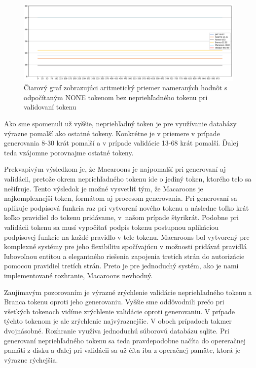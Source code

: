 \begin{figure}
  \centerline{\includegraphics[width=1\textwidth]{images/request_line_avg_without_opaque}}
  \caption[Čiarový graf -- validácia, konštantný]{Čiarový graf zobrazujúci aritmetický priemer nameraných hodnôt s odpočítaným NONE tokenom bez nepriehľadného tokenu pri validovaní tokenu}
  \label{fig:request_line_avg_without_opaque}
\end{figure}

Ako sme spomenuli už vyššie, nepriehľadný token je pre využívanie databázy výrazne pomalší ako ostatné tokeny. Konkrétne je v priemere v prípade generovania 8-30 krát pomalší a v prípade validácie 13-68 krát pomalší. Ďalej teda vzájomne porovnajme ostatné tokeny.

Prekvapivým výsledkom je, že Macaroons je najpomalší pri generovaní aj validácii, pretože okrem nepriehľadného tokenu ide o jediný token, ktorého telo sa nešifruje. Tento výsledok je možné vysvetliť tým, že Macaroons je najkomplexnejší token, formátom aj procesom generovania. Pri generovaní sa aplikuje podpisová funkcia raz pri vytvorení nového tokenu a následne toľko krát koľko pravidiel do tokenu pridávame, v~našom prípade štyrikrát. Podobne pri validácii tokenu sa musí vypočítať podpis tokenu postupnou aplikáciou podpisovej funkcie na každé pravidlo v tele tokenu. Macaroons bol vytvorený pre komplexné systémy pre jeho flexibilitu spočívajúcu v možnosti pridávať pravidlá ľubovoľnou entitou a elegantného riešenia zapojenia tretích strán do autorizácie pomocou pravidiel tretích strán. Preto je pre jednoduchý systém, ako je nami implementované rozhranie, Macaroons nevhodný.

Zaujímavým pozorovaním je výrazné zrýchlenie validácie nepriehľadného tokenu a Branca tokenu oproti jeho generovaniu. Vyššie sme oddôvodnili prečo pri všetkých tokenoch vidíme zrýchlenie validácie oproti generovaniu. V prípade týchto tokenom je ale zrýchlenie najvýraznejšie. V oboch prípadoch takmer dvojnásobné. Rozhranie využíva jednoduchú súborovú databázu sqlite. Pri generovaní nepriehľadného tokenu sa teda pravdepodobne načíta do opereračnej pamäti z disku a ďalej pri validácii sa už číta iba z operačnej pamäte, ktorá je výrazne rýchejšia.


